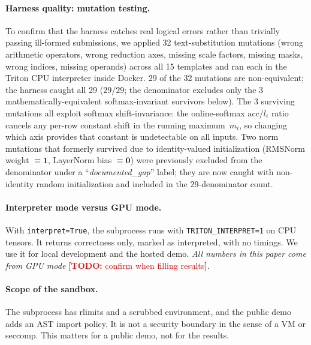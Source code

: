 \documentclass[11pt]{article}
\newcommand{\todo}[1]{\textcolor{red}{\textbf{[TODO:} #1\textbf{]}}}
\newcommand{\code}[1]{\texttt{#1}}
\begin{document}
\paragraph{Harness quality: mutation testing.}
To confirm that the harness catches real logical errors rather than trivially passing ill-formed
submissions, we applied 32 text-substitution mutations (wrong arithmetic operators, wrong
reduction axes, missing scale factors, missing masks, wrong indices, missing operands) across
all 15 templates and ran each in the Triton CPU interpreter inside Docker.
29 of the 32 mutations are non-equivalent; the harness caught all 29 ($29/29$; the
denominator excludes only the 3 mathematically-equivalent softmax-invariant survivors below).
The 3 surviving mutations all exploit softmax shift-invariance: the online-softmax
$\mathrm{acc}/l_i$ ratio cancels any per-row constant shift in the running maximum~$m_i$,
so changing which axis provides that constant is undetectable on all inputs.
Two norm mutations that formerly survived due to identity-valued initialization
(RMSNorm weight $\equiv\mathbf{1}$, LayerNorm bias $\equiv\mathbf{0}$) were previously
excluded from the denominator under a ``\textit{documented\_gap}'' label; they are now
caught with non-identity random initialization and included in the 29-denominator count.

\paragraph{Interpreter mode versus GPU mode.}
With \code{interpret=True}, the subprocess runs with \code{TRITON\_INTERPRET=1} on CPU tensors. It
returns correctness only, marked as interpreted, with no timings. We use it for local
development and the hosted demo. \emph{All numbers in this paper come from GPU mode} \todo{confirm
when filling results}.

\paragraph{Scope of the sandbox.}
The subprocess has rlimits and a scrubbed environment, and the public demo adds an AST import
policy. It is not a security boundary in the sense of a VM or seccomp. %
This matters for a public demo, not for the results.
\end{document}
